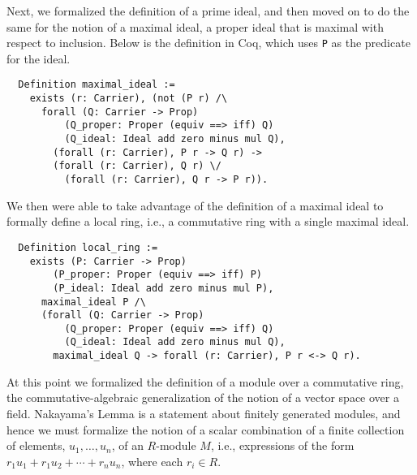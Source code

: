 \documentclass{article}
\begin{document}
Next, we formalized the definition of a  prime ideal, and then 
moved on to do the same for the notion of a maximal ideal, a proper ideal 
that is maximal with respect to inclusion. Below is the definition in Coq, which
uses \texttt{P} as the predicate for the ideal.

\begin{verbatim}
  Definition maximal_ideal :=
    exists (r: Carrier), (not (P r) /\
      forall (Q: Carrier -> Prop)
          (Q_proper: Proper (equiv ==> iff) Q)
          (Q_ideal: Ideal add zero minus mul Q),
        (forall (r: Carrier), P r -> Q r) ->
        (forall (r: Carrier), Q r) \/
          (forall (r: Carrier), Q r -> P r)).
\end{verbatim}

We then were able to take advantage of the definition of a maximal ideal
to formally define a local
ring, i.e., a commutative ring with a single maximal ideal.
 
\begin{verbatim}
  Definition local_ring :=
    exists (P: Carrier -> Prop)
        (P_proper: Proper (equiv ==> iff) P)
        (P_ideal: Ideal add zero minus mul P),
      maximal_ideal P /\
      (forall (Q: Carrier -> Prop)
          (Q_proper: Proper (equiv ==> iff) Q)
          (Q_ideal: Ideal add zero minus mul Q),
        maximal_ideal Q -> forall (r: Carrier), P r <-> Q r).
\end{verbatim}


At this point we formalized the definition of a module over a commutative ring,
the commutative-algebraic generalization of the notion of a vector space over a
field. Nakayama's Lemma is a statement about finitely generated modules, and
hence we must formalize the notion of a scalar combination of a finite
collection of elements, $u_1, \ldots, u_n$, of an $R$-module $M$, i.e.,
expressions of the form $r_1 u_1 + r_1 u_2 + \cdots + r_n u_n$, where each
$r_i \in R$.
\end{document}
